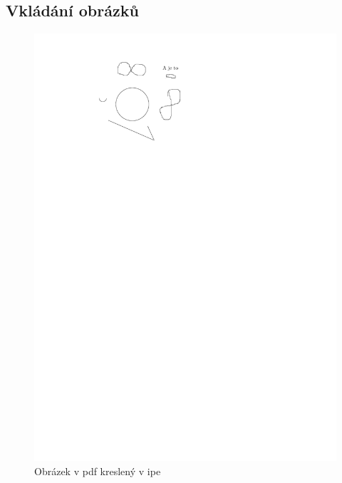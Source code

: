 \documentclass[12pt,a4paper,oneside]{article}
\numberwithin{equation}{section} %
\numberwithin{figure}{section} %
\numberwithin{table}{section} %
\begin{document}
\subsection{Vkládání obrázků}
\begin{figure}[h] %
\begin{center}
\includegraphics{Obrzkusmo.pdf}
\caption{Obrázek v pdf kreslený v ipe} %
\end{center}
\end{figure}
\vspace*{10mm}
\end{document}
